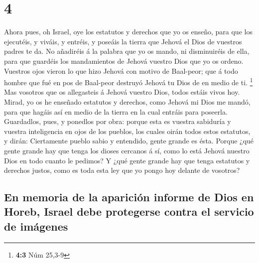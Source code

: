 \hypertarget{section-3}{%
\section{4}\label{section-3}}

 Ahora pues, oh Israel, oye los estatutos y derechos que yo
os enseño, para que los ejecutéis, y viváis, y entréis, y poseáis la
tierra que Jehová el Dios de vuestros padres te da.  No
añadiréis á la palabra que yo os mando, ni disminuiréis de ella, para
que guardéis los mandamientos de Jehová vuestro Dios que yo os ordeno.
 Vuestros ojos vieron lo que hizo Jehová con motivo de
Baal-peor; que á todo hombre que fué en pos de Baal-peor destruyó Jehová
tu Dios de en medio de ti. \footnote{\textbf{4:3} Núm 25,3-9}
 Mas vosotros que os allegasteis á Jehová vuestro Dios,
todos estáis vivos hoy.  Mirad, yo os he enseñado estatutos
y derechos, como Jehová mi Dios me mandó, para que hagáis así en medio
de la tierra en la cual entráis para poseerla.  Guardadlos,
pues, y ponedlos por obra: porque esta es vuestra sabiduría y vuestra
inteligencia en ojos de los pueblos, los cuales oirán todos estos
estatutos, y dirán: Ciertamente pueblo sabio y entendido, gente grande
es ésta.  Porque ¿qué gente grande hay que tenga los dioses
cercanos á sí, como lo está Jehová nuestro Dios en todo cuanto le
pedimos?  Y ¿qué gente grande hay que tenga estatutos y
derechos justos, como es toda esta ley que yo pongo hoy delante de
vosotros?

\hypertarget{en-memoria-de-la-apariciuxf3n-informe-de-dios-en-horeb-israel-debe-protegerse-contra-el-servicio-de-imuxe1genes}{%
\subsection{En memoria de la aparición informe de Dios en Horeb, Israel
debe protegerse contra el servicio de
imágenes}\label{en-memoria-de-la-apariciuxf3n-informe-de-dios-en-horeb-israel-debe-protegerse-contra-el-servicio-de-imuxe1genes}}

